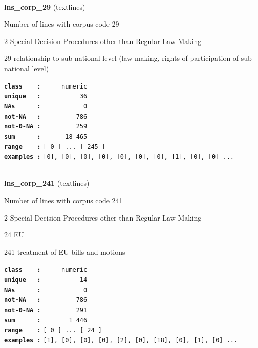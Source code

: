 \documentclass[]{article}
\begin{document}
~

\textbf{lns\_corp\_29} (textlines)

Number of lines with corpus code 29

2 Special Decision Procedures other than Regular Law-Making

29 relationship to sub-national level (law-making, rights of
participation of sub-national level)

\textbf{\texttt{class\ \ \ \ :}} \texttt{~~~~~numeric}\\
\textbf{\texttt{unique\ \ \ :}} \texttt{~~~~~~~~~~36}\\
\textbf{\texttt{NAs\ \ \ \ \ \ :}} \texttt{~~~~~~~~~~~0}\\
\textbf{\texttt{not-NA\ \ \ :}} \texttt{~~~~~~~~~786}\\
\textbf{\texttt{not-0-NA\ :}} \texttt{~~~~~~~~~259}\\
\textbf{\texttt{sum\ \ \ \ \ \ :}} \texttt{~~~~~~18~465}\\
\textbf{\texttt{range\ \ \ \ :}}
\texttt{{[}\ 0\ {]}\ ...\ {[}\ 245\ {]}}\\
\textbf{\texttt{examples\ :}}
\texttt{{[}0{]},\ {[}0{]},\ {[}0{]},\ {[}0{]},\ {[}0{]},\ {[}0{]},\ {[}0{]},\ {[}1{]},\ {[}0{]},\ {[}0{]}\ ...}\\

~

\textbf{lns\_corp\_241} (textlines)

Number of lines with corpus code 241

2 Special Decision Procedures other than Regular Law-Making

24 EU

241 treatment of EU-bills and motions

\textbf{\texttt{class\ \ \ \ :}} \texttt{~~~~~numeric}\\
\textbf{\texttt{unique\ \ \ :}} \texttt{~~~~~~~~~~14}\\
\textbf{\texttt{NAs\ \ \ \ \ \ :}} \texttt{~~~~~~~~~~~0}\\
\textbf{\texttt{not-NA\ \ \ :}} \texttt{~~~~~~~~~786}\\
\textbf{\texttt{not-0-NA\ :}} \texttt{~~~~~~~~~291}\\
\textbf{\texttt{sum\ \ \ \ \ \ :}} \texttt{~~~~~~~1~446}\\
\textbf{\texttt{range\ \ \ \ :}}
\texttt{{[}\ 0\ {]}\ ...\ {[}\ 24\ {]}}\\
\textbf{\texttt{examples\ :}}
\texttt{{[}1{]},\ {[}0{]},\ {[}0{]},\ {[}0{]},\ {[}2{]},\ {[}0{]},\ {[}18{]},\ {[}0{]},\ {[}1{]},\ {[}0{]}\ ...}\\
\end{document}
